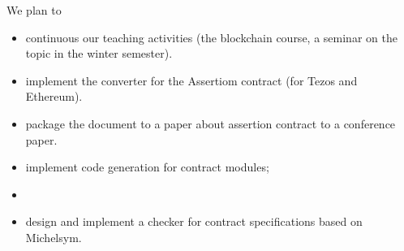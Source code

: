 \documentclass[a4paper,11pt]{article}
\begin{document}
We plan to 
\begin{itemize}
\item continuous our teaching activities (the blockchain course, a seminar on the topic in the winter semester).
\item implement the converter for the Assertiom contract (for Tezos and Ethereum). 
\item package the document to a paper about assertion contract to a conference paper.
\item implement code generation for contract modules; 
\item 
\item design and implement a checker for contract specifications based on Michelsym.
\end{itemize}





\end{document}
